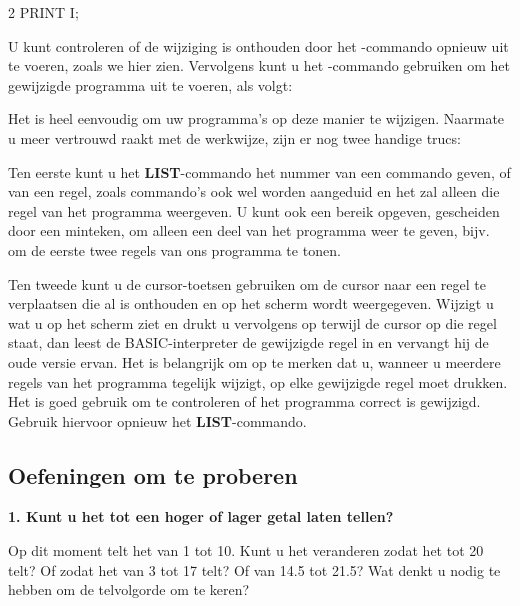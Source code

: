 \begin{screencode}
2 PRINT I;
\end{screencode}


\needspace{4cm} %

U kunt controleren of de wijziging is onthouden door het -commando opnieuw uit te voeren, zoals we hier zien. Vervolgens kunt u het -commando gebruiken om het gewijzigde programma uit te voeren, als volgt:


Het is heel eenvoudig om uw programma's op deze manier te wijzigen. Naarmate u meer vertrouwd raakt met de werkwijze, zijn er nog twee handige trucs:

Ten eerste kunt u het {\bf LIST}-commando het nummer van een commando geven, of van een regel, zoals commando's ook wel worden aangeduid en het zal alleen die regel van het programma weergeven. U kunt ook een bereik opgeven, gescheiden door een minteken, om alleen een deel van het programma weer te geven, bijv.  om de eerste twee regels van ons programma te tonen.

Ten tweede kunt u de cursor-toetsen gebruiken om de cursor naar een regel te verplaatsen die al is onthouden en op het scherm wordt weergegeven. Wijzigt u wat u op het scherm ziet en drukt u vervolgens op  terwijl de cursor op die regel staat, dan leest de BASIC-interpreter de gewijzigde regel in en vervangt hij de oude versie ervan. Het is belangrijk om op te merken dat u, wanneer u meerdere regels van het programma tegelijk wijzigt, op elke gewijzigde regel  moet drukken. Het is goed gebruik om te controleren of het programma correct is gewijzigd. Gebruik hiervoor opnieuw het {\bf LIST}-commando.


\subsection{Oefeningen om te proberen}

{\bf 1. Kunt u het tot een hoger of lager getal laten tellen?}

Op dit moment telt het van 1 tot 10. Kunt u het veranderen zodat het tot 20 telt? Of zodat het van 3 tot 17 telt? Of van 14.5 tot 21.5? Wat denkt u nodig te hebben om de telvolgorde om te keren?

